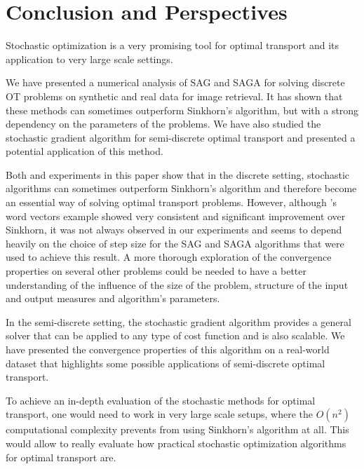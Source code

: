 \section{Conclusion and Perspectives}
Stochastic optimization is a very promising tool for optimal transport and its application to very large scale settings. 

We have presented a numerical analysis of SAG and SAGA for solving discrete OT problems on synthetic and real data for image retrieval. It has shown that these methods can sometimes outperform Sinkhorn's algorithm, but with a strong dependency on the parameters of the problems. We have also studied the stochastic gradient algorithm for semi-discrete optimal transport and presented a potential application of this method. 

Both \cite{genevay_stochastic_2016} and experiments in this paper show that in the discrete setting, stochastic algorithms can sometimes outperform Sinkhorn's algorithm and therefore become an essential way of solving optimal transport problems. However, although \cite{genevay_stochastic_2016}'s word vectors example showed very consistent and significant improvement over Sinkhorn, it was not always observed in our experiments and seems to depend heavily on the choice of step size for the SAG and SAGA algorithms that were used to achieve this result. A more thorough exploration of the convergence properties on several other problems could be needed to have a better understanding of the influence of the size of the problem, structure of the input and output measures and algorithm's parameters.

In the semi-discrete setting, the stochastic gradient algorithm provides a general solver that can be applied to any type of cost function and is also scalable. We have presented the convergence properties of this algorithm on a real-world dataset that highlights some possible applications of semi-discrete optimal transport.

To achieve an in-depth evaluation of the stochastic methods for optimal transport, one would need to work in very large scale setups, where the $O(n^2)$ computational complexity prevents from using Sinkhorn's algorithm at all. This would allow to really evaluate how practical stochastic optimization algorithms for optimal transport are. 